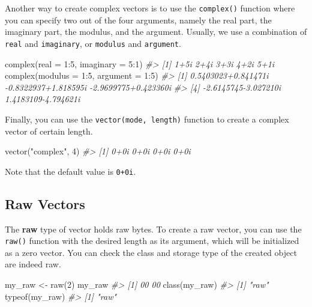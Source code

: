 \documentclass[
]{book}
\newenvironment{Shaded}{\begin{snugshade}}{\end{snugshade}}
\newcommand{\AttributeTok}[1]{\textcolor[rgb]{0.77,0.63,0.00}{#1}}
\newcommand{\CommentTok}[1]{\textcolor[rgb]{0.56,0.35,0.01}{\textit{#1}}}
\newcommand{\DecValTok}[1]{\textcolor[rgb]{0.00,0.00,0.81}{#1}}
\newcommand{\FunctionTok}[1]{\textcolor[rgb]{0.00,0.00,0.00}{#1}}
\newcommand{\NormalTok}[1]{#1}
\newcommand{\OtherTok}[1]{\textcolor[rgb]{0.56,0.35,0.01}{#1}}
\newcommand{\SpecialCharTok}[1]{\textcolor[rgb]{0.00,0.00,0.00}{#1}}
\newcommand{\StringTok}[1]{\textcolor[rgb]{0.31,0.60,0.02}{#1}}
\begin{document}
Another way to create complex vectors is to use the \texttt{complex()} function where you can specify two out of the four arguments, namely the real part, the imaginary part, the modulus, and the argument. Usually, we use a combination of \texttt{real} and \texttt{imaginary}, or \texttt{modulus} and \texttt{argument}.

\begin{Shaded}
\begin{Highlighting}[]
\FunctionTok{complex}\NormalTok{(}\AttributeTok{real =} \DecValTok{1}\SpecialCharTok{:}\DecValTok{5}\NormalTok{, }\AttributeTok{imaginary =} \DecValTok{5}\SpecialCharTok{:}\DecValTok{1}\NormalTok{)}
\CommentTok{\#\textgreater{} [1] 1+5i 2+4i 3+3i 4+2i 5+1i}
\FunctionTok{complex}\NormalTok{(}\AttributeTok{modulus =} \DecValTok{1}\SpecialCharTok{:}\DecValTok{5}\NormalTok{, }\AttributeTok{argument =} \DecValTok{1}\SpecialCharTok{:}\DecValTok{5}\NormalTok{)}
\CommentTok{\#\textgreater{} [1]  0.5403023+0.841471i {-}0.8322937+1.818595i {-}2.9699775+0.423360i}
\CommentTok{\#\textgreater{} [4] {-}2.6145745{-}3.027210i  1.4183109{-}4.794621i}
\end{Highlighting}
\end{Shaded}

Finally, you can use the \texttt{vector(mode,\ length)} function to create a complex vector of certain length.

\begin{Shaded}
\begin{Highlighting}[]
\FunctionTok{vector}\NormalTok{(}\StringTok{"complex"}\NormalTok{, }\DecValTok{4}\NormalTok{)}
\CommentTok{\#\textgreater{} [1] 0+0i 0+0i 0+0i 0+0i}
\end{Highlighting}
\end{Shaded}

Note that the default value is \texttt{0+0i}.

\hypertarget{raw-vectors}{%
\subsection{Raw Vectors}\label{raw-vectors}}

The \textbf{raw} type of vector holds raw bytes. To create a raw vector, you can use the \texttt{raw()} function with the desired length as its argument, which will be initialized as a zero vector. You can check the class and storage type of the created object are indeed raw.

\begin{Shaded}
\begin{Highlighting}[]
\NormalTok{my\_raw }\OtherTok{\textless{}{-}} \FunctionTok{raw}\NormalTok{(}\DecValTok{2}\NormalTok{)}
\NormalTok{my\_raw}
\CommentTok{\#\textgreater{} [1] 00 00}
\FunctionTok{class}\NormalTok{(my\_raw)}
\CommentTok{\#\textgreater{} [1] "raw"}
\FunctionTok{typeof}\NormalTok{(my\_raw)}
\CommentTok{\#\textgreater{} [1] "raw"}
\end{Highlighting}
\end{Shaded}
\end{document}
